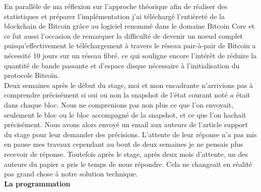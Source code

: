 \documentclass[12pt,a4paper]{article}
\begin{document}
	En parallèle de ma réflexion sur l'approche théorique afin de réaliser des statistiques et préparer l'implémentation j'ai téléchargé l'entièreté de la blockchain de Bitcoin grâce au logiciel renommé dans le domaine Bitcoin Core et ce fut aussi l'occasion de remarquer la difficulté de devenir un noeud complet puisqu'effectivement le téléchargement à travers le réseau pair-à-pair de Bitcoin a nécessité 10 jours sur un réseau fibré, ce qui souligne encore l'intérêt de réduire la quantité de bande passante et d'espace disque nécessaire à l'initialisation du protocole Bitcoin.\\ %
	Deux semaines après le début du stage, moi et mon encadrante n'arrivions pas à comprendre précisément si oui ou non la snapshot de l'état courant noté $a$ était dans chaque bloc. Nous ne comprenions pas non plus ce que l'on envoyait, seulement le bloc ou le bloc accompagné de la snapshot, et ce que l'on hachait précisément. Nous avons alors envoyé un email aux auteurs de l'article support du stage pour leur demander des précisions. L'attente de leur réponse n'a pas mis en pause mes travaux cependant au bout de deux semaines je ne pensais plus recevoir de réponse. Toutefois après le stage, après deux mois d'attente, un des auteurs du papier a pris le temps de nous répondre. Cela ne changeait en réalité pas grand chose à notre solution technique.\\ %
	
	\textbf{La programmation\\}
	
\end{document}
